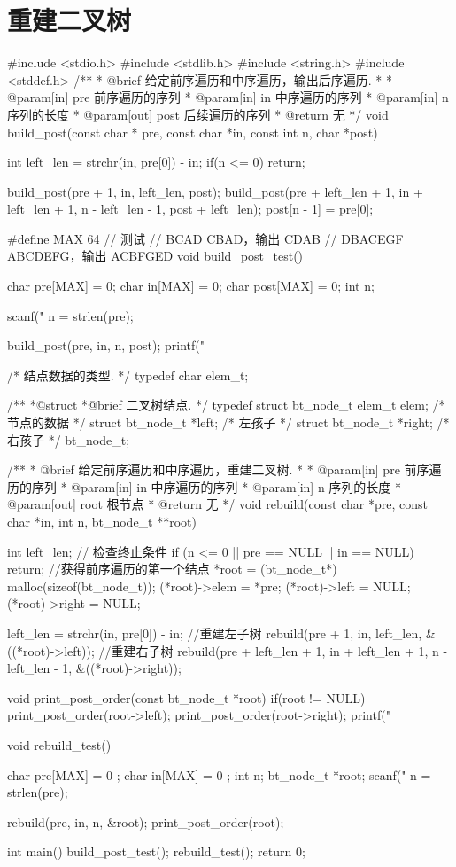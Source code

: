 \section{重建二叉树} %
\begin{Codex}[label=binary_tree_rebuild.c]
#include <stdio.h>
#include <stdlib.h>
#include <string.h>
#include <stddef.h>
/**
 * @brief 给定前序遍历和中序遍历，输出后序遍历.
 *
 * @param[in] pre 前序遍历的序列
 * @param[in] in 中序遍历的序列
 * @param[in] n 序列的长度
 * @param[out] post 后续遍历的序列
 * @return 无
 */
void build_post(const char * pre, const char *in, const int n, char *post) {
    int left_len = strchr(in, pre[0]) - in;
    if(n <= 0) return;
    
    build_post(pre + 1, in, left_len, post);
    build_post(pre + left_len + 1, in + left_len + 1,
            n - left_len - 1, post + left_len);
    post[n - 1] = pre[0];
}

#define MAX  64
// 测试
// BCAD CBAD，输出 CDAB
// DBACEGF ABCDEFG，输出 ACBFGED
void build_post_test() {
    char pre[MAX] = {0};
    char in[MAX] = {0};
    char post[MAX] = {0};
    int n;

    scanf("%
    n = strlen(pre);

    build_post(pre, in, n, post);
    printf("%
}

/* 结点数据的类型. */
typedef char elem_t;

/**
 *@struct
 *@brief 二叉树结点.
 */
typedef struct bt_node_t {
    elem_t elem; /* 节点的数据 */
    struct bt_node_t *left; /* 左孩子 */
    struct bt_node_t *right; /* 右孩子 */
} bt_node_t;

/**
 * @brief 给定前序遍历和中序遍历，重建二叉树.
 *
 * @param[in] pre 前序遍历的序列
 * @param[in] in 中序遍历的序列
 * @param[in] n 序列的长度
 * @param[out] root 根节点
 * @return 无
 */
void rebuild(const char *pre, const char *in, int n, bt_node_t **root) {
    int left_len;
    // 检查终止条件
    if (n <= 0 || pre == NULL || in == NULL)
        return;
    //获得前序遍历的第一个结点
    *root = (bt_node_t*) malloc(sizeof(bt_node_t));
    (*root)->elem = *pre;
    (*root)->left = NULL;
    (*root)->right = NULL;

    left_len = strchr(in, pre[0]) - in;
    //重建左子树
    rebuild(pre + 1, in, left_len, &((*root)->left));
    //重建右子树
    rebuild(pre + left_len + 1, in + left_len + 1, n - left_len - 1,
            &((*root)->right));
}

void print_post_order(const bt_node_t *root) {
    if(root != NULL) {
        print_post_order(root->left);
        print_post_order(root->right);
        printf("%
    }
}

void rebuild_test() {
    char pre[MAX] = { 0 };
    char in[MAX] = { 0 };
    int n;
    bt_node_t *root;
    scanf("%
    n = strlen(pre);
    
    rebuild(pre, in, n, &root);
    print_post_order(root);
}

int main() {
    build_post_test();
    rebuild_test();
    return 0;
}
\end{Codex}

